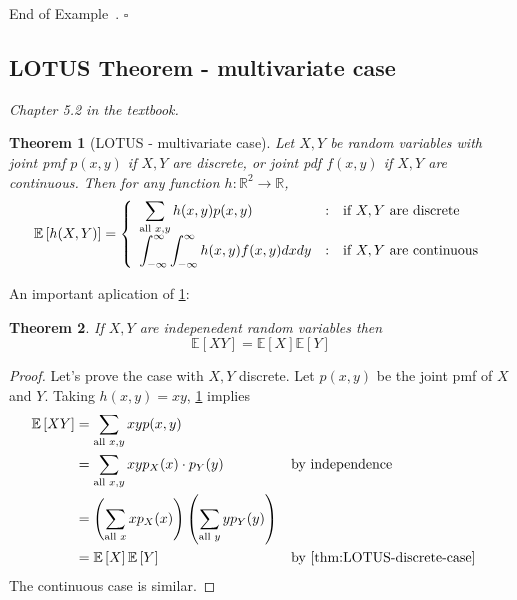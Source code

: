 \documentclass[10pt]{article}
\newtheorem{theorem}{Theorem}
\theoremstyle{definition}
\newtheorem{example}[theorem]{Example}
\renewenvironment{example}
{\begin{oldexample}}
  {\par\smallskip\hfill   End of Example~\theexample. $\square$    \par\end{oldexample}}
\newcommand{\1}[1]{\textbf{1}_{\left[#1\right]}} %
\def\R{\mathbb{R}} %
\def\E{\mathbb{E}} %
\def\P{\mathbb{P}} %
\begin{document}
\begin{example}
\end{example}

\subsection{LOTUS Theorem - multivariate case}
\textit{Chapter 5.2 in the textbook.}

\begin{theorem}[LOTUS - multivariate case]
  \label{thm:LOTUS-multivariate-case}
  Let $X,Y$ be random variables with joint pmf $p(x,y)$ if $X,Y$ are discrete,
  or joint pdf $f(x,y)$ if $X,Y$ are continuous. Then for any function
  $h:\R^{2} \to \R$,
  \begin{equation*}
    \E\left[h(X,Y) \right] =\left\{ \begin{array}{l@{\quad:\quad}l}
        \displaystyle\sum_{\text{all }x,y} h(x,y)p(x,y) & \text{if $X,Y$ are discrete}\\
        \displaystyle \int_{-\infty}^{\infty}\int_{-\infty}^{\infty}h(x,y)f(x,y)dxdy   & \text{if $X,Y$ are continuous}
      \end{array}\right.
  \end{equation*}
\end{theorem}

An important aplication of \cref{thm:LOTUS-multivariate-case}:

\begin{theorem}
  \label{thm:independent-expectations-factorize}
  If $X,Y$ are indepenedent random variables then
  \begin{equation*}
    \E\left[XY \right] = \E\left[X \right] \E\left[Y \right]
  \end{equation*}
\end{theorem}
\begin{proof}
  Let's prove the case with $X,Y$ discrete. Let $p(x,y)$ be the joint pmf of
  $X$ and $Y$. Taking $h(x,y) = xy$, \cref{thm:LOTUS-multivariate-case} implies
  \begin{align*}
    \E\left[XY \right] 
    &= \sum_{\text{all }x,y} xyp(x,y)\\
    &= \sum_{\text{all }x,y} xyp_{X}(x) \cdot p_{Y}(y) &&\text{by independence}\\
    &= \left( \sum_{\text{all }x} xp_{X}(x) \right) \left( \sum_{\text{all }y}yp_{Y}(y)  \right)\\   
    &= \E\left[X \right] \E\left[Y \right] &&\text{by \cref{thm:LOTUS-discrete-case}}
  \end{align*}
  The continuous case is similar.
\end{proof}
\end{document}
